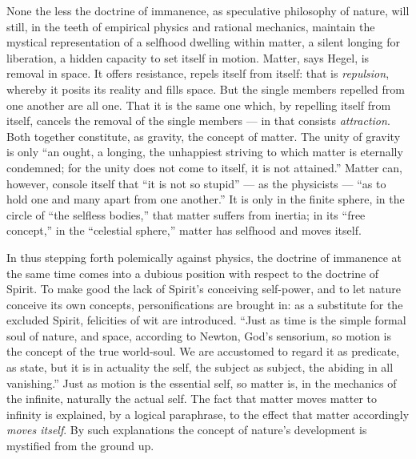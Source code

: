 \documentclass[12pt,a4paper]{book}
\begin{document}
None the less the doctrine of immanence, as speculative philosophy of nature, will
still, in the teeth of empirical physics and rational mechanics, maintain the mystical
representation of a selfhood dwelling within matter, a silent longing for liberation, a
hidden capacity to set itself in motion. Matter, says Hegel, is removal in space. It
offers resistance, repels itself from itself: that is \emph{repulsion}, whereby it
posits its reality and fills space. But the single members repelled from one another are
all one. That it is the same one which, by repelling itself from itself, cancels the
removal of the single members --- in that consists \emph{attraction}. Both together
constitute, as gravity, the concept of matter. The unity of gravity is only ``an ought,
a longing, the
unhappiest striving to which matter is eternally
condemned; for the unity does not come to itself, it is not attained.'' Matter can,
however, console itself that ``it is not so stupid'' --- as the physicists --- ``as to
hold one and many apart from one another.'' It is only in the finite sphere, in the
circle of ``the selfless bodies,'' that matter suffers from inertia; in its ``free
concept,'' in the ``celestial sphere,'' matter has selfhood and moves itself.

In thus stepping forth polemically against physics, the doctrine of immanence at the
same time comes into a dubious position with respect to the doctrine of Spirit. To make
good the lack of Spirit's conceiving self-power, and to let nature conceive
its own concepts, personifications are brought in: as a substitute for the excluded
Spirit, felicities of wit are introduced. ``Just as time is the simple formal soul of
nature, and space, according to Newton, God's sensorium, so motion is the concept of the
true world-soul. We are accustomed to regard it as predicate, as state, but it is in
actuality the self, the subject as subject, the abiding in all vanishing.'' Just as
motion is the essential self, so matter is, in the mechanics of the infinite, naturally
the actual self. The fact that matter moves matter to infinity is explained, by a
logical paraphrase, to the effect that matter accordingly \emph{moves itself}. By such
explanations the concept of nature's development is mystified from the ground up.
\end{document}
